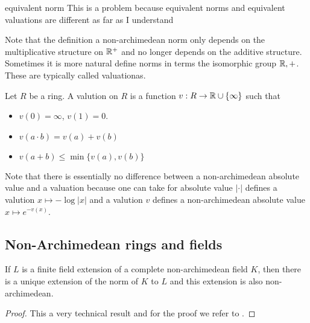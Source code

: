 \begin{definition}
	equivalent norm
	{\color{red} This is a problem because equivalent norms and equivalent valuations are different as far as I understand}
\end{definition}

Note that the definition a non-archimedean norm only depends on the multiplicative structure on $\mathbb{R}^{+}$ and no longer depends on the additive structure. 
Sometimes it is more natural define norms in terms the isomorphic group $\mathbb{R}, +$. 
These are typically called valuationas. 


\begin{definition}
	Let $R$ be a ring. A valution on $R$ is a function $v:R \to \mathbb{R} \cup \{\infty\} $ such that 	
	\begin{itemize}
		\item $v(0) = \infty$, $v(1) = 0$. 
		\item $v(a\cdot b) = v(a) + v(b)$
		\item $v(a + b) \le \min\{v(a), v(b)\}$
	\end{itemize}
\end{definition}

\begin{remark}
	Note that there is essentially no difference between a non-archimedean absolute value and a valuation because one can take for absolute value $|\cdot |$ defines a valution $x \mapsto -\log |x|$ and a valution $v$ defines a non-archimedean absolute value $x\mapsto e^{- v(x)}$. 
\end{remark}



\subsection{Non-Archimedean rings and fields} \label{sec:non-archimedean_rings_and_fields}


\begin{theorem}\label{thm:norm_finite_field_ext}
	If $L$ is a finite field extension of a complete non-archimedean field $K$, then there is a unique extension of the norm of $K$ to $L$ and this extension is also non-archimedean.
\end{theorem}
\begin{proof}
	This a very technical result and for the proof we refer to \cite[][appendix A]{boschLecturesFormalRigid2014}. 
\end{proof}

